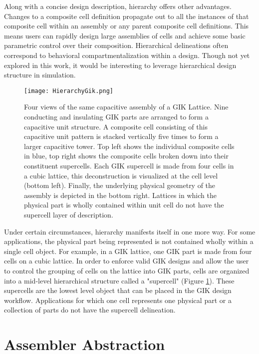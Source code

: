 {Along with a concise design description, hierarchy offers other advantages.  Changes to a composite cell definition propagate out to all the instances of that composite cell within an assembly or any parent composite cell definitions.  This means users can rapidly design large assemblies of cells and achieve some basic parametric control over their composition.    Hierarchical delineations often correspond to behavioral compartmentalization within a design.  Though not yet explored in this work, it would be interesting to leverage hierarchical design structure in simulation.\\

\begin{figure}
  \texttt{[image: HierarchyGik.png]}
  \caption{Four views of the same capacitive assembly of a GIK Lattice.  Nine conducting and insulating GIK parts are arranged to form a capacitive unit structure.  A composite cell consisting of this capacitive unit pattern is stacked vertically five times to form a larger capacitive tower.  Top left shows the individual composite cells in blue, top right shows the composite cells broken down into their constituent supercells.  Each GIK supercell is made from four cells in a cubic lattice, this deconstruction is visualized at the cell level (bottom left).  Finally, the underlying physical geometry of the assembly is depicted in the bottom right.  Lattices in which the physical part is wholly contained within unit cell do not have the supercell layer of description.}
  \label{fig:HierarchyGik}
\end{figure}

Under certain circumstances, hierarchy manifests itself in one more way.  For some applications, the physical part being represented is not contained wholly within a single cell object.  For example, in a GIK lattice, one GIK part is made from four cells on a cubic lattice.  In order to enforce valid GIK designs and allow the user to control the grouping of cells on the lattice into GIK parts, cells are organized into a mid-level hierarchical structure called a "supercell" (Figure \ref{fig:HierarchyGik}).  These supercells are the lowest level object that can be placed in the GIK design workflow.  Applications for which one cell represents one physical part or a collection of parts do not have the supercell delineation.

\section{Assembler Abstraction}

}
